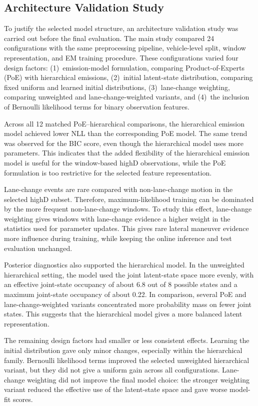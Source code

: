 \documentclass[upint,subscriptcorrection,varvw,hyphenate,balance,greek,russian,vietnamese,german]{asmeconf} %
\begin{document}
\subsection{Architecture Validation Study}
To justify the selected model structure, an architecture validation study was carried out before the final evaluation. 
The main study compared 24 configurations with the same preprocessing pipeline, vehicle-level split, window representation, 
and EM training procedure. 
These configurations varied four design factors: 
(1)~emission-model formulation, comparing Product-of-Experts (PoE) \cite{Hinton2002} with hierarchical emissions, 
(2)~initial latent-state distribution, comparing fixed uniform and learned initial distributions, 
(3)~lane-change weighting, comparing unweighted and lane-change-weighted variants, and 
(4)~the inclusion of Bernoulli likelihood terms for binary observation features.

Across all 12 matched PoE--hierarchical comparisons, the hierarchical emission model achieved lower NLL than the 
corresponding PoE model. 
The same trend was observed for the BIC score, even though the hierarchical model uses more parameters. 
This indicates that the added flexibility of the hierarchical emission model is useful for the window-based highD observations, 
while the PoE formulation is too restrictive for the selected feature representation.

Lane-change events are rare compared with non-lane-change motion in the selected highD subset. 
Therefore, maximum-likelihood training can be dominated by the more frequent non-lane-change windows. 
To study this effect, lane-change weighting gives windows with lane-change evidence a higher weight in the statistics used for parameter updates. 
This gives rare lateral maneuver evidence more influence during training, while keeping the online inference and test evaluation unchanged.

Posterior diagnostics also supported the hierarchical model. 
In the unweighted hierarchical setting, the model used the joint latent-state space more evenly, with an effective joint-state 
occupancy of about 6.8 out of 8 possible states and a maximum joint-state occupancy of about 0.22. 
In comparison, several PoE and lane-change-weighted variants concentrated more probability mass on fewer joint states. 
This suggests that the hierarchical model gives a more balanced latent representation.

The remaining design factors had smaller or less consistent effects. 
Learning the initial distribution gave only minor changes, especially within the hierarchical family. 
Bernoulli likelihood terms improved the selected unweighted hierarchical variant, but they did not give a uniform gain across all 
configurations. 
Lane-change weighting did not improve the final model choice: the stronger weighting variant reduced the effective use of the 
latent-state space and gave worse model-fit scores.
\end{document}
